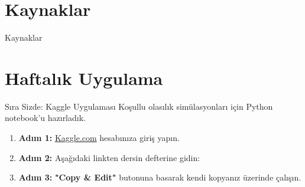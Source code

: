 \documentclass[light]{lutbeamer}
\begin{document}
\section{Kaynaklar}
\begin{frame}[allowframebreaks]{Kaynaklar}
    \nocite{*}
    \printbibliography{}
\end{frame}

\section{Haftalık Uygulama}
\begin{frame}{Sıra Sizde: Kaggle Uygulaması}
    \justifying{}
    Koşullu olasılık simülasyonları için Python notebook'u hazırladık.
    
    \vspace{0.5cm}
    \begin{enumerate}
        \item \textbf{Adım 1:} \href{https://www.kaggle.com}{Kaggle.com} hesabınıza giriş yapın.
        \item \textbf{Adım 2:} Aşağıdaki linkten dersin defterine gidin:
        
        \vspace{0.3cm}
        \begin{center}
        \end{center}
        \vspace{0.3cm}
        
        \item \textbf{Adım 3:} \textbf{"Copy \& Edit"} butonuna basarak kendi kopyanız üzerinde çalışın.
    \end{enumerate}
\end{frame}
\end{document}
